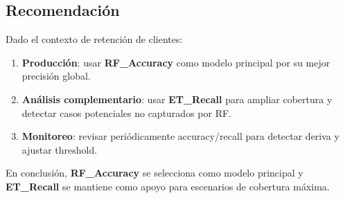 \subsection{Recomendación}

Dado el contexto de retención de clientes:

\begin{enumerate}
  \item \textbf{Producción}: usar \textbf{RF\_Accuracy} como modelo principal por su mejor precisión global.
  \item \textbf{Análisis complementario}: usar \textbf{ET\_Recall} para ampliar cobertura y detectar casos potenciales no capturados por RF.
  \item \textbf{Monitoreo}: revisar periódicamente accuracy/recall para detectar deriva y ajustar threshold.
\end{enumerate}

En conclusión, \textbf{RF\_Accuracy} se selecciona como modelo principal y \textbf{ET\_Recall} se mantiene como apoyo para escenarios de cobertura máxima.
